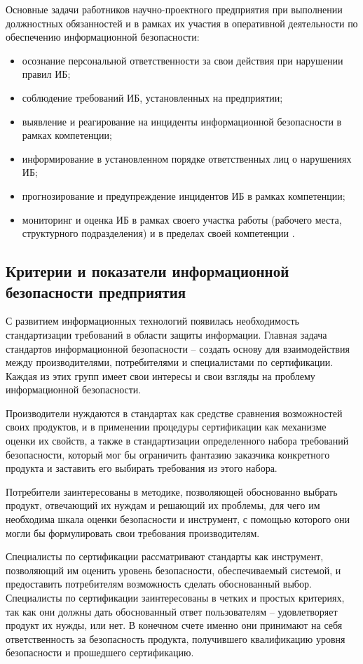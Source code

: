 Основные задачи работников научно-проектного предприятия при выполнении должностных обязанностей и в рамках их участия в оперативной деятельности по обеспечению информационной безопасности:
\begin{itemize}
	\item осознание персональной ответственности за свои действия при нарушении правил ИБ;
	\item соблюдение требований ИБ, установленных на предприятии;
	\item выявление и реагирование на инциденты информационной безопасности в рамках компетенции;
	\item информирование в установленном порядке ответственных лиц о нарушениях ИБ;
	\item прогнозирование и предупреждение инцидентов ИБ в рамках компетенции;
	\item мониторинг и оценка ИБ в рамках своего участка работы (рабочего места, структурного подразделения) и в пределах своей компетенции \cite{bsmu_privacy}.
\end{itemize}

\subsection{Критерии и показатели информационной безопасности предприятия}
\label{subsec:mechanisms:indicators}

С развитием информационных технологий появилась необходимость стандартизации требований в области защиты информации.
Главная задача стандартов информационной безопасности -- создать основу для взаимодействия между производителями, потребителями и специалистами по сертификации.
Каждая из этих групп имеет свои интересы и свои взгляды на проблему информационной безопасности.

Производители нуждаются в стандартах как средстве сравнения возможностей своих продуктов, и в применении процедуры сертификации как механизме оценки их свойств, а также в стандартизации определенного набора требований безопасности, который мог бы ограничить фантазию заказчика конкретного продукта и заставить его выбирать требования из этого набора.

Потребители заинтересованы в методике, позволяющей обоснованно выбрать продукт, отвечающий их нуждам и решающий их проблемы, для чего им необходима шкала оценки безопасности и инструмент, с помощью которого они могли бы формулировать свои требования производителям.

Специалисты по сертификации рассматривают стандарты как инструмент, позволяющий им оценить уровень безопасности, обеспечиваемый системой, и предоставить потребителям возможность сделать обоснованный выбор. Специалисты по сертификации заинтересованы в четких и простых критериях, так как они должны дать обоснованный ответ пользователям -- удовлетворяет продукт их нужды, или нет.
В конечном счете именно они принимают на себя ответственность за безопасность продукта, получившего квалификацию уровня безопасности и прошедшего сертификацию.

